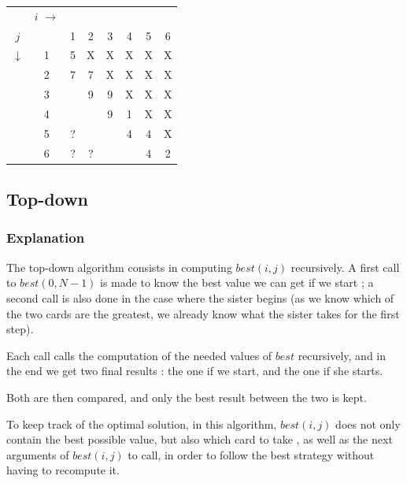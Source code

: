 \documentclass[11pt]{article}
\begin{document}
	\begin{tabular}[c]{cc|cccccc}
		& $i$ $\rightarrow$\\

		$j$          &   & 1 & 2 & 3 & 4 & 5 & 6 \\
		             \cline{2-8}
		$\downarrow$ & 1 & 5 & X & X & X & X & X \\
		             & 2 & 7 & 7 & X & X & X & X \\
		             & 3 &   & 9 & 9 & X & X & X \\
		             & 4 &   &   & 9 & 1 & X & X \\
		             & 5 & ? &   &   & 4 & 4 & X \\
		             & 6 & ? & ? &   &   & 4 & 2
		
	\end{tabular}

\subsection{Top-down}
\subsubsection{Explanation}
The top-down algorithm consists in computing $best(i, j)$ recursively.
A first call to $best(0, N-1)$ is made to know the best value we can get
if we start ; a second call is also done in the case where the sister begins
(as we know which of the two cards are the greatest, we already know what the
sister takes for the first step).

Each call calls the computation of the needed values of $best$ recursively, and
in the end we get two final results : the one if we start,
and the one if she starts.

Both are then compared, and only the best result between the two is kept.

To keep track of the optimal solution, in this algorithm, $best(i, j)$ does not
only contain the best possible value, but also which card to take
, as well as the next arguments of $best(i, j)$ to call, 
in order to follow the best strategy without having to recompute it.
\end{document}

